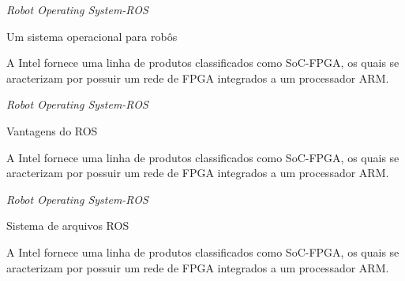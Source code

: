 \documentclass[10pt]{beamer}
\begin{document}

\begin{frame}{\textit{Robot Operating System-ROS}}
	\begin{alertblock}{Um sistema operacional para robôs}
		\vspace{0.1cm}
		\begin{justify}
			A Intel fornece uma linha de produtos classificados como SoC-FPGA, os quais se aracterizam por possuir um rede de FPGA integrados a um processador ARM.
		\end{justify}
		

	\end{alertblock}
\end{frame}

\begin{frame}{\textit{Robot Operating System-ROS}}
	\begin{alertblock}{Vantagens do ROS}
		\vspace{0.1cm}
		\begin{justify}
			A Intel fornece uma linha de produtos classificados como SoC-FPGA, os quais se aracterizam por possuir um rede de FPGA integrados a um processador ARM.
		\end{justify}
		

	\end{alertblock}
\end{frame}

\begin{frame}{\textit{Robot Operating System-ROS}}
	\begin{alertblock}{Sistema de arquivos ROS}
		\vspace{0.1cm}
		\begin{justify}
			A Intel fornece uma linha de produtos classificados como SoC-FPGA, os quais se aracterizam por possuir um rede de FPGA integrados a um processador ARM.
		\end{justify}
		

	\end{alertblock}
\end{frame}
\end{document}
